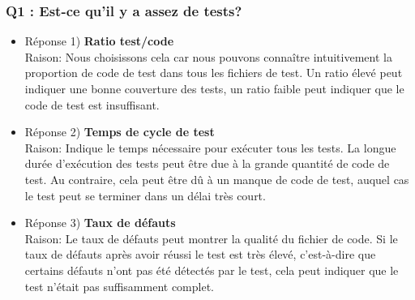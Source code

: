 \documentclass{proc}
\begin{document}
\subsubsection*{Q1 : Est-ce qu'il y a assez de tests?}
\begin{itemize}
    \item Réponse 1) \textbf{Ratio test/code}
    \\Raison:
    Nous choisissons cela car nous pouvons connaître intuitivement la proportion de code de test dans tous les fichiers de test. Un ratio élevé peut indiquer une bonne couverture des tests, un ratio faible peut indiquer que le code de test est insuffisant. 
    \item Réponse 2) \textbf{Temps de cycle de test}
    \\Raison:
    Indique le temps nécessaire pour exécuter tous les tests. La longue durée d’exécution des tests peut être due à la grande quantité de code de test. Au contraire, cela peut être dû à un manque de code de test, auquel cas le test peut se terminer dans un délai très court.
    \item Réponse 3) \textbf{Taux de défauts}
    \\Raison:
    Le taux de défauts peut montrer la qualité du fichier de code. Si le taux de défauts après avoir réussi le test est très élevé, c'est-à-dire que certains défauts n'ont pas été détectés par le test, cela peut indiquer que le test n'était pas suffisamment complet.
\end{itemize}
\end{document}
